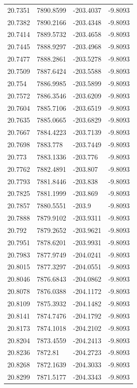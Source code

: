 \begin{table}[H]
\begin{tabular}{llll}
20.7351 & 7890.8599 & -203.4037 & -9.8093 \\
20.7382 & 7890.2166 & -203.4348 & -9.8093 \\
20.7414 & 7889.5732 & -203.4658 & -9.8093 \\
20.7445 & 7888.9297 & -203.4968 & -9.8093 \\
20.7477 & 7888.2861 & -203.5278 & -9.8093 \\
20.7509 & 7887.6424 & -203.5588 & -9.8093 \\
20.754 & 7886.9985 & -203.5899 & -9.8093 \\
20.7572 & 7886.3546 & -203.6209 & -9.8093 \\
20.7604 & 7885.7106 & -203.6519 & -9.8093 \\
20.7635 & 7885.0665 & -203.6829 & -9.8093 \\
20.7667 & 7884.4223 & -203.7139 & -9.8093 \\
20.7698 & 7883.778 & -203.7449 & -9.8093 \\
20.773 & 7883.1336 & -203.776 & -9.8093 \\
20.7762 & 7882.4891 & -203.807 & -9.8093 \\
20.7793 & 7881.8446 & -203.838 & -9.8093 \\
20.7825 & 7881.1999 & -203.869 & -9.8093 \\
20.7857 & 7880.5551 & -203.9 & -9.8093 \\
20.7888 & 7879.9102 & -203.9311 & -9.8093 \\
20.792 & 7879.2652 & -203.9621 & -9.8093 \\
20.7951 & 7878.6201 & -203.9931 & -9.8093 \\
20.7983 & 7877.9749 & -204.0241 & -9.8093 \\
20.8015 & 7877.3297 & -204.0551 & -9.8093 \\
20.8046 & 7876.6843 & -204.0862 & -9.8093 \\
20.8078 & 7876.0388 & -204.1172 & -9.8093 \\
20.8109 & 7875.3932 & -204.1482 & -9.8093 \\
20.8141 & 7874.7476 & -204.1792 & -9.8093 \\
20.8173 & 7874.1018 & -204.2102 & -9.8093 \\
20.8204 & 7873.4559 & -204.2413 & -9.8093 \\
20.8236 & 7872.81 & -204.2723 & -9.8093 \\
20.8268 & 7872.1639 & -204.3033 & -9.8093 \\
20.8299 & 7871.5177 & -204.3343 & -9.8093 \\

\end{tabular}
\end{table}
